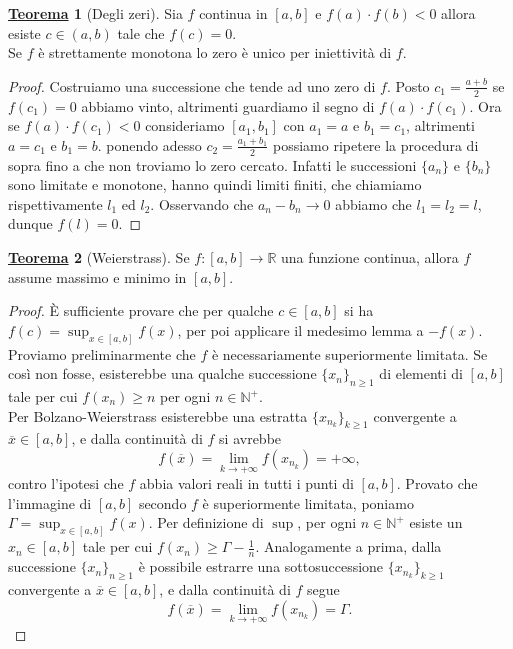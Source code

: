 \documentclass[a4paper,twoside]{article}
\newcommand{\N}{\mathbb{N}}
\newcommand{\R}{\mathbb{R}}
\theoremstyle{definition}
\newtheorem{theorem}{\color{Red}\underline{\textrm Teorema}}
\newenvironment{theo}
  {\begin{shaded}\begin{theorem}}
  {\end{theorem}\end{shaded}}
\numberwithin{theorem}{section}
\begin{document}
\begin{theorem}[Degli zeri] Sia $f$ continua in $[a,b]$ e $f(a)\cdot f(b)<0$ allora esiste $c\in (a,b)$ tale che $f(c)=0$.\\ Se $f$ è strettamente monotona lo zero è unico per iniettività di $f$.
\end{theorem}
\begin{proof}
Costruiamo una successione che tende ad uno zero di $f$. Posto $c_1=\frac{a+b}{2}$ se $f(c_1)=0$ abbiamo vinto, altrimenti guardiamo il segno di $f(a)\cdot f(c_1)$. Ora se $f(a)\cdot f(c_1)<0$ consideriamo $[a_1,b_1]$ con $a_1=a$ e $b_1=c_1$, altrimenti $a=c_1$ e $b_1=b$. ponendo adesso $c_2=\frac{a_1+b_1}{2}$ possiamo ripetere la procedura di sopra fino a che non troviamo lo zero cercato. Infatti le successioni $\{a_n\}$ e $\{b_n\}$ sono limitate e monotone, hanno quindi limiti finiti, che chiamiamo rispettivamente $l_1$ ed $l_2$. 
Osservando che $a_n - b_n\to 0$ abbiamo che $l_1=l_2=l$, dunque $f(l)=0$.
\end{proof}


\begin{theo}[Weierstrass]
Se $f:[a,b]\to \R$ una funzione continua, allora $f$ assume massimo e minimo in $[a,b]$.\end{theo}
\begin{proof} È sufficiente provare che per qualche $c\in[a,b]$ si ha $f(c)=\sup_{x\in[a,b]}f(x)$, per poi applicare il medesimo lemma a $-f(x)$. Proviamo preliminarmente che $f$ è necessariamente superiormente limitata. Se così non fosse, esisterebbe una qualche successione $\{x_n\}_{n\geq 1}$ di elementi di $[a,b]$ tale per cui $f(x_n)\geq n$ per ogni $n\in\N^+$.\\ Per Bolzano-Weierstrass esisterebbe una estratta $\{x_{n_k}\}_{k\geq 1}$ convergente a $\overline{x}\in[a,b]$, e dalla continuità di $f$ si avrebbe 
$$f(\overline{x})=\lim_{k\to +\infty} f(x_{n_k}) = +\infty, $$
contro l'ipotesi che $f$ abbia valori reali in tutti i punti di $[a,b]$. Provato che l'immagine di $[a,b]$ secondo $f$ è superiormente limitata, poniamo $\Gamma=\sup_{x\in[a,b]}f(x)$. Per definizione di $\sup$, per ogni $n\in\N^+$ esiste un $x_n\in[a,b]$ tale per cui $f(x_n)\geq \Gamma-\frac{1}{n}$. Analogamente a prima, dalla successione $\{x_n\}_{n\geq 1}$ è possibile estrarre una sottosuccessione $\{x_{n_k}\}_{k\geq 1}$ convergente a $\overline{x}\in[a,b]$, e dalla continuità di $f$ segue 
$$ f(\overline{x})= \lim_{k\to +\infty} f(x_{n_k}) = \Gamma. $$
 
\end{proof}
\end{document}
